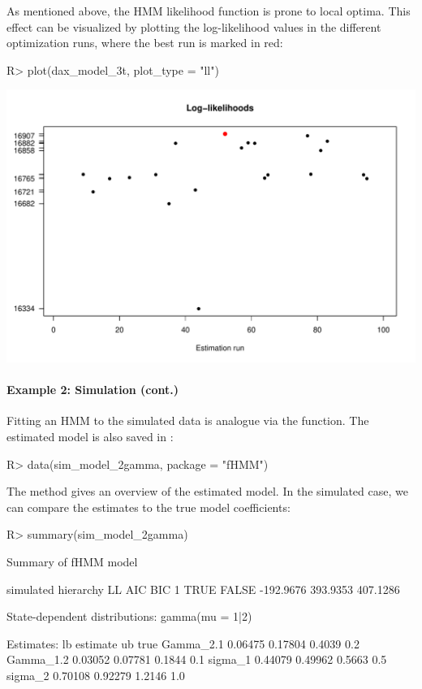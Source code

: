 \documentclass[article]{jss}
\newcommand{\fct}[1]{\code{#1()}}
\begin{document}
As mentioned above, the HMM likelihood function is prone to local optima. This effect can be visualized by plotting the log-likelihood values in the different optimization runs, where the best run is marked in red:

%
\begin{Schunk}
\begin{Sinput}
R> plot(dax_model_3t, plot_type = "ll")
\end{Sinput}
\end{Schunk}
\includegraphics{fhmm_oelschlaeger_adam_michels-dax-ll}
%

\paragraph{Example 2: Simulation (cont.)} Fitting an HMM to the simulated data is analogue via the \fct{fit\_model} function. The estimated model  is also saved in : 

%
\begin{Schunk}
\begin{Sinput}
R> data(sim_model_2gamma, package = "fHMM")
\end{Sinput}
\end{Schunk}
%

The \fct{summary} method gives an overview of the estimated model. In the simulated case, we can compare the estimates to the true model coefficients:

%
\begin{Schunk}
\begin{Sinput}
R> summary(sim_model_2gamma)
\end{Sinput}
\begin{Soutput}
Summary of fHMM model

  simulated hierarchy        LL      AIC      BIC
1      TRUE     FALSE -192.9676 393.9353 407.1286

State-dependent distributions:
gamma(mu = 1|2) 

Estimates:
               lb estimate     ub true
Gamma_2.1 0.06475  0.17804 0.4039  0.2
Gamma_1.2 0.03052  0.07781 0.1844  0.1
sigma_1   0.44079  0.49962 0.5663  0.5
sigma_2   0.70108  0.92279 1.2146  1.0
\end{Soutput}
\end{Schunk}
%
\end{document}
